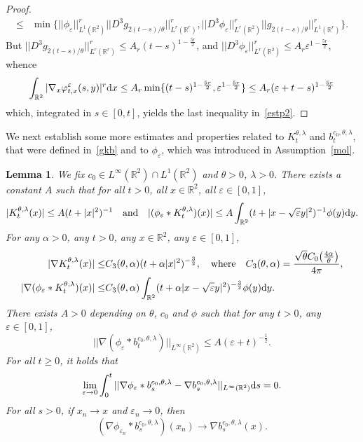\documentclass[11pt]{article}
\newtheorem{lemma}[theorem]{Lemma}
\newcommand{\R}{\mathbb{R}}
\newcommand{\1}{\mathbbm{1}}
\newcommand{\dd}{{\rm d}}
\newcommand{\e}{\varepsilon}
\begin{document}
\begin{proof}
\begin{align*}
\leq& \min\Big\{||\phi_\e||_{L^1(\R^2)}^r||D^3 g_{2(t-s)/\theta}||_{L^r(\R^r)}^r,
||D^3\phi_\e||_{L^r(\R^2)}^r||g_{2(t-s)/\theta}||_{L^1(\R^r)}^r \Big\}.
\end{align*}
But $||D^3 g_{2(t-s)/\theta}||_{L^r(\R^r)}^r\leq A_r (t-s)^{1-\frac{5r}2}$,
and $||D^3\phi_\e||_{L^r(\R^2)}^r \leq A_r \e^{1-\frac{5r}2}$, whence
\begin{align*}
\int_{\R^2} |\nabla_x\varphi^\e_{t,x}(s,y)|^r \dd x \leq A_r \min\{(t-s)^{1-\frac{5r}2},\e^{1-\frac{5r}2}\}\leq 
A_r(\e+t-s)^{1-\frac{5r}2}
\end{align*}
which, integrated in $s\in [0,t]$, yields the last inequality in~\eqref{estp2}.
\end{proof} 


We next establish some more estimates and properties related to $K^{\theta,\lambda}_t$ and $b^{c_0,\theta,\lambda}_t$, that were defined in~\eqref{gkb} and to $\phi_\e$, which 
was introduced in Assumption~\ref{mol}.

\begin{lemma} We fix $c_0 \in L^\infty(\R^2)\cap L^1(\R^2)$ and $\theta>0$, $\lambda>0$.
There exists a constant $A$ such that for all $t> 0$, all $x\in\R^2$, all $\e\in [0,1]$,
\begin{equation}\label{tri0}
|K^{\theta,\lambda}_t(x)|\leq A (t+|x|^2)^{-1} \quad \text{and} \quad 
|(\phi_\e \ast K^{\theta,\lambda}_t)(x)|\leq A \int_{\R^2} (t+|x-\sqrt \e y|^2)^{-1} \phi(y)\dd y.
\end{equation}
For any $\alpha>0$, any $t>0$, any $x\in \R^2$, any $\e\in [0,1]$,
\begin{align}
|\nabla K^{\theta,\lambda}_t(x)|\leq &
C_3(\theta,\alpha)(t+\alpha |x|^2)^{-\frac{3}{2}}, \quad \text{where} \quad C_3(\theta,\alpha)=\frac{\sqrt \theta C_0\big(\frac{4\alpha}{\theta}\big)}{4\pi}, \label{tri1p}\\
|\nabla (\phi_\e \ast K^{\theta,\lambda}_t)(x)|\leq& 
C_3(\theta,\alpha)\int_{\R^2}(t+\alpha |x-\sqrt\e y|^2)^{-\frac{3}{2}}\phi(y)\dd y.
\label{tri1}
\end{align}
There exists $A>0$ depending on $\theta$, $c_0$ and $\phi$ such that for any $t>0$, any $\e\in [0,1]$,
\begin{equation}\label{rmu}
||\nabla (\phi_{\e}\ast b^{c_0,\theta,\lambda}_t) ||_{L^\infty(\R^2)}\leq  A (\e+t)^{-\frac 1 2}.
\end{equation}
For all $t\geq 0$, it holds that
\begin{equation}\label{rtt2}
\lim_{\e\to 0}\int_0^t ||\nabla \phi_{\e}\ast b^{c_0,\theta,\lambda}_{s} - \nabla b^{c_0,\theta,\lambda}_{s}||_{L^\infty(\R^2)} 
\dd s=0.
\end{equation}
For all $s>0$, if $x_n\to x$ and $\e_n\to 0$, then
\begin{equation}\label{rtt1}
(\nabla \phi_{\e_n}\ast b^{c_0,\theta,\lambda}_{s})(x_n)\to \nabla b^{c_0,\theta,\lambda}_{s}(x).
\end{equation}
\end{lemma}
\end{document}
